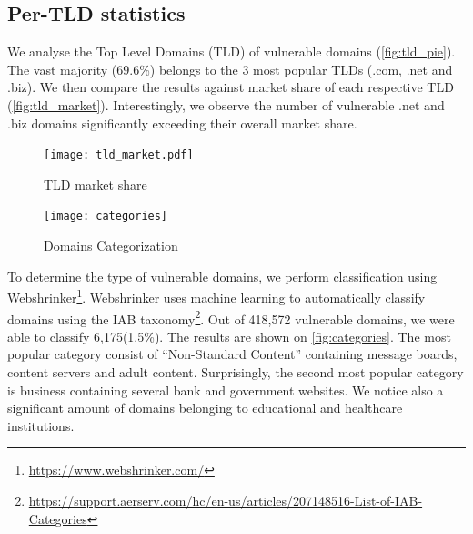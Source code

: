 {\begin{figure}[!ht]
\end{figure}



% 



\subsection{Per-TLD statistics}

We analyse the Top Level Domains (TLD) of vulnerable domains (\autoref{fig:tld_pie}). The vast majority (69.6\%) belongs to the 3 most popular TLDs (.com, .net and .biz). We then compare the results against market share of each respective TLD (\autoref{fig:tld_market}). Interestingly, we observe the number of vulnerable .net and .biz domains significantly exceeding their overall market share. 


\begin{figure}[!hbt]
\centering
\texttt{[image: tld\_market.pdf]}
\caption{TLD market share}
\label{fig:tld_market}
\end{figure}



\begin{figure}[!hbt]
\centering
\texttt{[image: categories]}
\caption{Domains Categorization}
\label{fig:categories}
\end{figure}

To determine the type of vulnerable domains, we perform classification using Webshrinker\footnote{\url{https://www.webshrinker.com/}}. Webshrinker uses machine learning to automatically classify domains using the IAB taxonomy\footnote{\url{https://support.aerserv.com/hc/en-us/articles/207148516-List-of-IAB-Categories}}. Out of 418,572 vulnerable domains, we were able to classify 6,175(1.5\%). 
The results are shown on \autoref{fig:categories}. The most popular category consist of ``Non-Standard Content'' containing message boards, content servers and adult content. Surprisingly, the second most popular category is business containing several bank and government websites. We notice also a significant amount of domains belonging to educational and healthcare institutions. 

}
